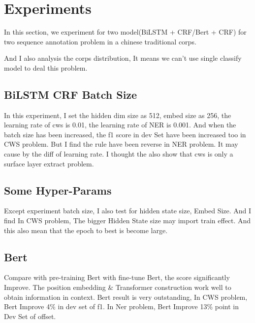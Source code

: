 \section{Experiments}
\label{sec:experiments}

In this section, we experiment for two model(BiLSTM + CRF/Bert + CRF) for two sequence annotation problem in a chinese traditional corps.

And I also analysis the corps distribution, It means we can't use single classify model to deal this problem.

\subsection{BiLSTM CRF Batch Size}
\label{sec:BiLSTM CRF Batch Size}

In this experiment, I set the hidden dim size as 512, embed size as 256, the learning rate of cws is 0.01, the learning rate of NER is 0.001.
And when the batch size has been increased, the f1 score in dev Set have been increased too in CWS problem. 
But I find the rule have been reverse in NER problem. It may cause by the diff of learning rate. I thought the also show that cws is only a surface layer extract problem.

\subsection{Some Hyper-Params}
\label{sec:hyper params} 

Except experiment batch size, I also test for hidden state size, Embed Size.
And I find In CWS problem, The bigger Hidden State size may import train effect.
And this also mean that the epoch to best is become large.

\subsection{Bert}
\label{sec:bert}

Compare with pre-training Bert with fine-tune Bert, the score significantly Improve.
The position embedding \& Transformer construction work well to obtain information in context.
Bert result is very outstanding, In CWS problem, Bert Improve 4\% in dev set of f1. In Ner problem, Bert Improve 13\% point in Dev Set of offset.
 

